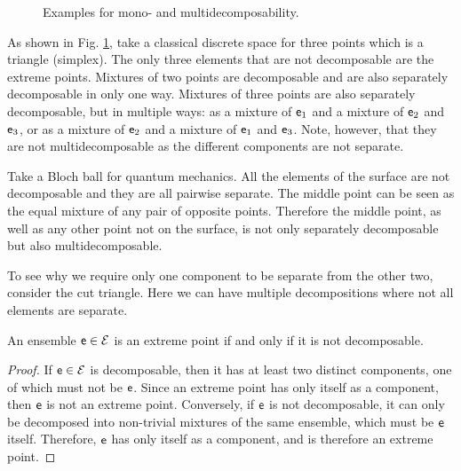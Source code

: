 \begin{mathSection}
\begin{figure}[H]
	\caption{Examples for mono- and multidecomposability.}\label{pm-es-fig-monodecomposability}
\end{figure}

\begin{remark}
	As shown in Fig. \ref{pm-es-fig-monodecomposability}, take a classical discrete space for three points which is a triangle (simplex). The only three elements that are not decomposable are the extreme points. Mixtures of two points are decomposable and are also separately decomposable in only one way. Mixtures of three points are also separately decomposable, but in multiple ways: as a mixture of $\mathsf{e}_1$ and a mixture of $\mathsf{e}_2$ and $\mathsf{e}_3$, or as a mixture of $\mathsf{e}_2$ and a mixture of $\mathsf{e}_1$ and $\mathsf{e}_3$. Note, however, that they are not multidecomposable as the different components are not separate.
	
	Take a Bloch ball for quantum mechanics. All the elements of the surface are not decomposable and they are all pairwise separate. The middle point can be seen as the equal mixture of any pair of opposite points. Therefore the middle point, as well as any other point not on the surface, is not only separately decomposable but also multidecomposable.
	
	To see why we require only one component to be separate from the other two, consider the cut triangle. Here we can have multiple decompositions where not all elements are separate.
\end{remark}

\begin{coro}
	An ensemble $\mathsf{e} \in \mathcal{E}$ is an extreme point if and only if it is not decomposable.
\end{coro}

\begin{proof}
	If $\mathsf{e} \in \mathcal{E}$ is decomposable, then it has at least two distinct components, one of which must not be $\mathsf{e}$. Since an extreme point has only itself as a component, then $\mathsf{e}$ is not an extreme point. Conversely, if $\mathsf{e}$ is not decomposable, it can only be decomposed into non-trivial mixtures of the same ensemble, which must be $\mathsf{e}$ itself. Therefore, $\mathsf{e}$ has only itself as a component, and is therefore an extreme point.
\end{proof}


\end{mathSection}
